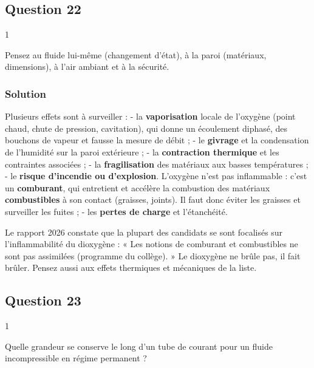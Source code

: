 \documentclass[11pt,a4paper]{article}
\begin{document}
\hypertarget{question-22}{%
\subsection{Question 22}\label{question-22}}

\begin{indication}{1}

Pensez au fluide lui-même (changement d'état), à la paroi (matériaux, dimensions), à l'air ambiant et à la sécurité.

\end{indication}

\hypertarget{solution-21}{%
\subsubsection{Solution}\label{solution-21}}

Plusieurs effets sont à surveiller :
- la \textbf{vaporisation} locale de l'oxygène (point chaud, chute de pression, cavitation), qui donne un écoulement diphasé, des bouchons de vapeur et fausse la mesure de débit ;
- le \textbf{givrage} et la condensation de l'humidité sur la paroi extérieure ;
- la \textbf{contraction thermique} et les contraintes associées ;
- la \textbf{fragilisation} des matériaux aux basses températures ;
- le \textbf{risque d'incendie ou d'explosion}. L'oxygène n'est pas inflammable : c'est un \textbf{comburant}, qui entretient et accélère la combustion des matériaux \textbf{combustibles} à son contact (graisses, joints). Il faut donc éviter les graisses et surveiller les fuites ;
- les \textbf{pertes de charge} et l'étanchéité.

\begin{piege}

Le rapport 2026 constate que la plupart des candidats se sont focalisés sur l'inflammabilité du dioxygène : « Les notions de comburant et combustibles ne sont pas assimilées (programme du collège). » Le dioxygène ne brûle pas, il fait brûler. Pensez aussi aux effets thermiques et mécaniques de la liste.

\end{piege}

\hypertarget{question-23}{%
\subsection{Question 23}\label{question-23}}

\begin{indication}{1}

Quelle grandeur se conserve le long d'un tube de courant pour un fluide incompressible en régime permanent ?

\end{indication}
\end{document}
